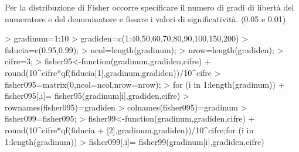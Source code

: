 \documentclass[onecolumn,11pt]{book}
\begin{document}
Per la  distribuzione di Fisher occorre specificare il numero di gradi di libert\`a del numeratore e del denominatore e fissare i valori di significativit\`a. (0.05 e 0.01)
\begin{Schunk}
\begin{Sinput}
> gradinum=1:10
> gradiden=c(1:40,50,60,70,80,90,100,150,200)
> fiducia=c(0.95,0.99);
> ncol=length(gradinum);
> nrow=length(gradiden);
> cifre=3;
> fisher95<-function(gradinum,gradiden,cifre)  
+ round(10^cifre*qf(fiducia[1],gradinum,gradiden))/10^cifre
> fisher095=matrix(0,ncol=ncol,nrow=nrow);
> for (i in 1:length(gradinum))  
+ fisher095[,i]= fisher95(gradinum[i],gradiden,cifre)
>  rownames(fisher095)=gradiden
> colnames(fisher095)=gradinum
> fisher099=fisher095;
> fisher99<-function(gradinum,gradiden,cifre)  
+ round(10^cifre*qf(fiducia
+ [2],gradinum,gradiden))/10^cifre;for (i in 1:length(gradinum)) 
> fisher099[,i]= fisher99(gradinum[i],gradiden,cifre)
\end{Sinput}
\end{Schunk}
 \setlength\textheight{9in}
\vfill\eject
\end{document}
